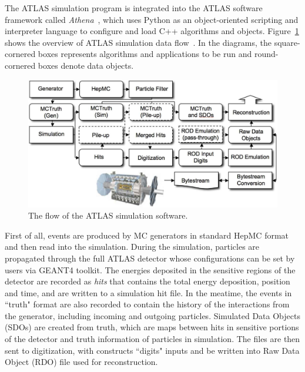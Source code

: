 
The ATLAS simulation program is integrated into the ATLAS software framework called \textit{Athena}~\cite{atlas:athena},
which uses Python as an object-oriented scripting and interpreter language to configure and load C++ algorithms and objects.
Figure~\ref{fig:frame_overview} shows the overview of ATLAS simulation data flow~\cite{Aad:2010ah}.
In the diagrams, the square-cornered boxes represents algorithms and applications to be run and round-cornered boxes denote data objects.
\begin{figure}[!htb]
  \centering
  \includegraphics[width=1.0\textwidth]{figures/Simulation/outline_atalsSimulation_v2.png}
  \caption{The flow of the ATLAS simulation software.}
  \label{fig:frame_overview}
\end{figure}

First of all, events are produced by MC generators in standard HepMC format and then read into the simulation.
During the simulation, particles are propagated through the full ATLAS detector whose configurations can be set by users via GEANT4 toolkit.
The energies deposited in the sensitive regions of the detector are recorded as \textit{hits} that contains the total energy deposition,
position and time, and are written to a simulation hit file.
In the meatime, the events in ``truth" format are also recorded to contain the history of the interactions from the generator, including incoming and outgoing particles.
Simulated Data Objects (SDOs) are created from truth, which are maps between hits in sensitive portions of the detector and truth information of particles in simulation.
The files are then sent to digitization, with constructs ``digits" inputs and be written into Raw Data Object (RDO) file used for reconstruction.

